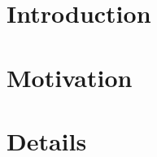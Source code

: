 \documentclass[hyperref]{beamer}
\title{\fontsize{50}{50}\selectfont{AVM$f$}}
\subtitle{An Open-Source Implementation of the Alternating Variable Method\vspace*{-.2in}}
\author[Gregory M. Kapfhammer]{Gregory M. Kapfhammer\\ Phil McMinn}
\institute[SSBSE 2016]{SSBSE 2016}
\date[October 9, 2016]{October 9, 2016}
\begin{document}
\begin{frame}
  \titlepage
\end{frame}

\section{Introduction}



\section{Motivation}





\section{Details}



\end{document}
